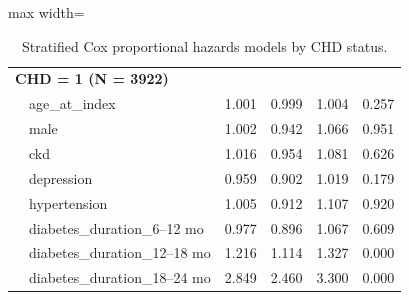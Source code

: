 \documentclass[twoside,11pt]{article}
\begin{document}
\begin{table}[H]
\begin{adjustbox}{max width=\textwidth}
\begin{tabular}{llcccc}
      \multicolumn{6}{l}{\textbf{CHD = 1 (N = 3922)}}                                                                                   \\
                       & age\_at\_index                & 1.001       & 0.999           & 1.004            & 0.257                       \\
                       & male                          & 1.002       & 0.942           & 1.066            & 0.951                       \\
                       & ckd                           & 1.016       & 0.954           & 1.081            & 0.626                       \\
                       & depression                    & 0.959       & 0.902           & 1.019            & 0.179                       \\
                       & hypertension                  & 1.005       & 0.912           & 1.107            & 0.920                       \\
                       & diabetes\_duration\_6--12 mo  & 0.977       & 0.896           & 1.067            & 0.609                       \\
                       & diabetes\_duration\_12--18 mo & 1.216       & 1.114           & 1.327            & \cellcolor{lightgreen}0.000 \\
                       & diabetes\_duration\_18--24 mo & 2.849       & 2.460           & 3.300            & \cellcolor{lightgreen}0.000 \\

      \hline
    \end{tabular}
  \end{adjustbox}
  \caption{Stratified Cox proportional hazards models by CHD status.}
  \label{tab:chd_stratified}
\end{table}
\end{document}
